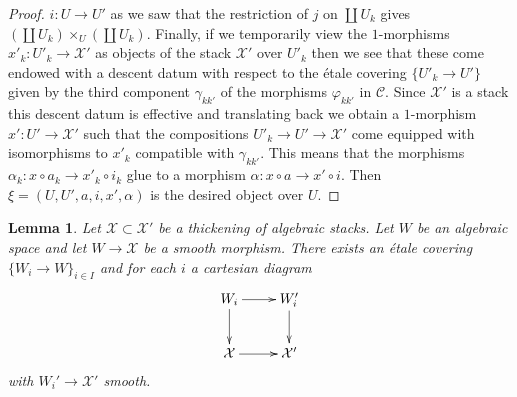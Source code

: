 \documentclass{stacks-project}
\theoremstyle{plain}
\newtheorem{lemma}[subsection]{Lemma}
\theoremstyle{definition}
\theoremstyle{remark}
\numberwithin{equation}{subsection}
\begin{document}
\begin{proof}
$i : U \to U'$ as we saw that the restriction of $j$ on
$\coprod U_k$ gives $(\coprod U_k) \times_U (\coprod U_k)$.
Finally, if we temporarily view the $1$-morphisms
$x'_k : U'_k \to \mathcal{X}'$ as objects of the stack
$\mathcal{X}'$ over $U'_k$ then we see that these come endowed with a
descent datum with respect to the \'etale covering
$\{U'_k \to U'\}$ given by the third component $\gamma_{kk'}$
of the morphisms $\varphi_{kk'}$ in $\mathcal{C}$.
Since $\mathcal{X}'$ is a stack
this descent datum is effective and translating back we obtain
a $1$-morphism $x' : U' \to \mathcal{X}'$ such that the compositions
$U'_k \to U' \to \mathcal{X}'$ come equipped with isomorphisms to $x'_k$
compatible with $\gamma_{kk'}$. This means that the morphisms
$\alpha_k : x \circ a_k \to x'_k \circ i_k$ glue to a morphism
$\alpha : x \circ a \to x' \circ i$. Then $\xi = (U, U', a, i, x', \alpha)$
is the desired object over $U$.
\end{proof}

\begin{lemma}
\label{lemma-etale-local-lifts}
Let $\mathcal{X} \subset \mathcal{X}'$ be a thickening of algebraic stacks.
Let $W$ be an algebraic space and let $W \to \mathcal{X}$ be a smooth morphism.
There exists an \'etale covering $\{W_i \to W\}_{i \in I}$ and for each $i$
a cartesian diagram
$$
\xymatrix{
W_i \ar[r] \ar[d] & W_i' \ar[d] \\
\mathcal{X} \ar[r] & \mathcal{X}'
}
$$
with $W_i' \to \mathcal{X}'$ smooth.
\end{lemma}
\end{document}

